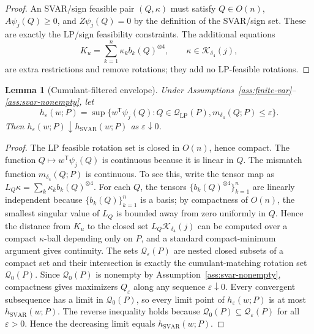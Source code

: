 \documentclass[11pt]{article}
\newcommand{\transpose}{\mathsf{T}}
\theoremstyle{definition}
\theoremstyle{plain}
\newtheorem{lemma}{Lemma}
\theoremstyle{remark}
\begin{document}
\begin{proof}
An SVAR/sign feasible pair \((Q,\kappa)\) must satisfy
\(Q\in O(n)\), \(A\psi_j(Q)\ge0\), and \(Z\psi_j(Q)=0\) by the definition of
the SVAR/sign set.  These are exactly the LP/sign feasibility constraints.
The additional equations
\[
K_u=\sum_{k=1}^n\kappa_k b_k(Q)^{\otimes4},
\qquad \kappa\in\mathcal K_{\delta_4}(j),
\]
are extra restrictions and remove rotations; they add no LP-feasible rotations.
\end{proof}

\begin{lemma}[Cumulant-filtered envelope]\label{lem:envelope}
Under Assumptions~\ref{ass:finite-var}--\ref{ass:svar-nonempty}, let
\[
h_\varepsilon(w;P)=
\sup\{w^\transpose\psi_j(Q):Q\in\mathcal Q_{\mathrm{LP}}(P),
m_{\delta_4}(Q;P)\le\varepsilon\}.
\]
Then \(h_\varepsilon(w;P)\downarrow h_{\mathrm{SVAR}}(w;P)\) as
\(\varepsilon\downarrow0\).
\end{lemma}

\begin{proof}
The LP feasible rotation set is closed in \(O(n)\), hence compact.  The
function \(Q\mapsto w^\transpose\psi_j(Q)\) is continuous because it is linear
in \(Q\).  The mismatch function \(m_{\delta_4}(Q;P)\) is continuous.  To see
this, write the tensor map as
\(L_Q\kappa=\sum_k\kappa_kb_k(Q)^{\otimes4}\).  For each \(Q\), the tensors
\(\{b_k(Q)^{\otimes4}\}_{k=1}^n\) are linearly independent because
\(\{b_k(Q)\}_{k=1}^n\) is a basis; by compactness of \(O(n)\), the smallest
singular value of \(L_Q\) is bounded away from zero uniformly in \(Q\).  Hence
the distance from \(K_u\) to the closed set \(L_Q\mathcal K_{\delta_4}(j)\)
can be computed over a compact \(\kappa\)-ball depending only on \(P\), and
a standard compact-minimum argument gives continuity.  The sets
\(\mathcal Q_\varepsilon(P)\) are nested closed subsets of a compact set and
their intersection is exactly the cumulant-matching rotation set
\(\mathcal Q_0(P)\).  Since \(\mathcal Q_0(P)\) is nonempty by
Assumption~\ref{ass:svar-nonempty}, compactness gives maximizers
\(Q_\varepsilon\) along any sequence \(\varepsilon\downarrow0\).  Every
convergent subsequence has a limit in \(\mathcal Q_0(P)\), so every limit point
of \(h_\varepsilon(w;P)\) is at most \(h_{\mathrm{SVAR}}(w;P)\).  The reverse
inequality holds because \(\mathcal Q_0(P)\subseteq\mathcal Q_\varepsilon(P)\)
for all \(\varepsilon>0\).  Hence the decreasing limit equals
\(h_{\mathrm{SVAR}}(w;P)\).
\end{proof}
\end{document}
